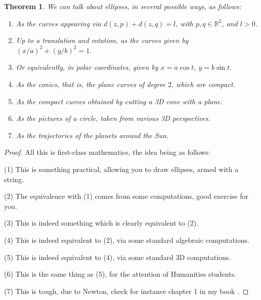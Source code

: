 \documentclass[12pt]{amsbook}
\newtheorem{theorem}{Theorem}[chapter]
\begin{document}
\begin{theorem}
We can talk about ellipses, in several possible ways, as follows:
\begin{enumerate}
\item As the curves appearing via $d(z,p)+d(z,q)=l$, with $p,q\in\mathbb R^2$, and $l>0$.

\item Up to a translation and rotation, as the curves given by $(x/a)^2+(y/b)^2=1$.

\item Or equivalently, in polar coordinates, given by $x=a\cos t$, $y=b\sin t$.

\item As the conics, that is, the plane curves of degree $2$, which are compact. 

\item As the compact curves obtained by cutting a 3D cone with a plane.

\item As the pictures of a circle, taken from various 3D perspectives.

\item As the trajectories of the planets around the Sun.
\end{enumerate}
\end{theorem}

\begin{proof}
All this is first-class mathematics, the idea being as follows:

\medskip

(1) This is something practical, allowing you to draw ellipses, armed with a string.

\medskip

(2) The equivalence with (1) comes from some computations, good exercise for you.

\medskip

(3) This is indeed something which is clearly equivalent to (2).

\medskip

(4) This is indeed equivalent to (2), via some standard algebraic computations.

\medskip

(5) This is indeed equivalent to (4), via some standard 3D computations.

\medskip

(6) This is the same thing as (5), for the attention of Humanities students.

\medskip

(7) This is tough, due to Newton, check for instance chapter 1 in my book \cite{ba3}.
\end{proof}
\end{document}
